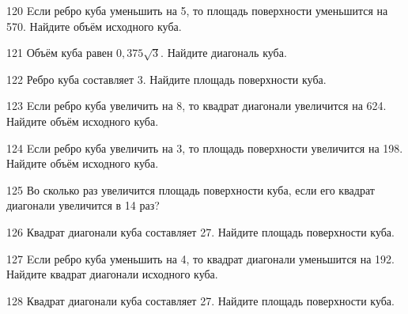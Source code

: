 \begin{taskBN}{120}
Eсли ребро куба уменьшить на 5, то площадь поверхности уменьшится на 570. Найдите объём исходного куба.
\end{taskBN}

\begin{taskBN}{121}
Объём куба равен $0,375\sqrt{3}$. Найдите диагональ куба.
\end{taskBN}

\begin{taskBN}{122}
Ребро куба составляет 3. Найдите площадь поверхности куба.
\end{taskBN}

\begin{taskBN}{123}
Eсли ребро куба увеличить на 8, то квадрат диагонали увеличится на 624. Найдите объём исходного куба.
\end{taskBN}

\begin{taskBN}{124}
Eсли ребро куба увеличить на 3, то площадь поверхности увеличится на 198. Найдите объём исходного куба.
\end{taskBN}

\begin{taskBN}{125}
Во сколько раз увеличится площадь поверхности куба, если его квадрат диагонали увеличится в 14 раз?
\end{taskBN}

\begin{taskBN}{126}
Квадрат диагонали куба составляет 27. Найдите площадь поверхности куба.
\end{taskBN}

\begin{taskBN}{127}
Eсли ребро куба уменьшить на 4, то квадрат диагонали уменьшится на 192. Найдите квадрат диагонали исходного куба.
\end{taskBN}

\begin{taskBN}{128}
Квадрат диагонали куба составляет 27. Найдите площадь поверхности куба.
\end{taskBN}

